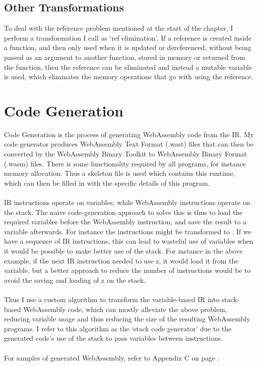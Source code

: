 \subsection{Other Transformations}
To deal with the reference problem mentioned at the start of the chapter, I perform a transformation I call as `ref elimination'. If a reference is created inside a function, and then only used when it is updated or dereferenced, without being passed as an argument to another function, stored in memory or returned from the function, then the reference can be eliminated and instead a mutable variable is used, which eliminates the memory operations that go with using the reference.


\section{Code Generation}

Code Generation is the process of generating WebAssembly code from the IR. My code generator produces WebAssembly Text Format (.wast) files that can then be converted by the WebAssembly Binary Toolkit to WebAssembly Binary Format (.wasm) files. There is some functionality required by all programs, for instance memory allocation. Thus a skeleton file is used which contains this runtime, which can then be filled in with the specific details of this program.
\\\\
IR instructions operate on variables, while WebAssembly instructions operate on the stack. The naive code-generation approach to solve this is thus to load the required variables before the WebAssembly instruction, and save the result to a variable afterwards. For instance the instructions  might be transformed to . If we have a sequence of IR instructions, this can lead to wasteful use of variables when it would be possible to make better use of the stack. For instance in the above example, if the next IR instruction needed to use z, it would load it from the variable, but a better approach to reduce the number of instructions would be to avoid the saving and loading of z on the stack.
\\\\
Thus I use a custom algorithm to transform the variable-based IR into stack-based WebAssembly code, which can mostly alleviate the above problem, reducing variable usage and thus reducing the size of the resulting WebAssembly programs. I refer to this algorithm as the `stack code generator' due to the generated code's use of the stack to pass variables between instructions.
\\\\
For samples of generated WebAssembly, refer to Appendix C on page \pageref{chapter:gcd}.

